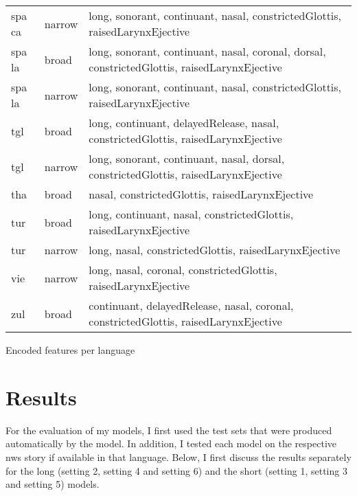 {\begin{tabularx}{1.1\textwidth}{|llX|}
spa ca             & narrow        & long, sonorant, continuant, nasal, constrictedGlottis, raisedLarynxEjective                                                        \\
spa la             & broad         & long, sonorant, continuant, nasal, coronal, dorsal, constrictedGlottis, raisedLarynxEjective                                       \\
spa la             & narrow        & long, sonorant, continuant, nasal, constrictedGlottis, raisedLarynxEjective                                                        \\
tgl                & broad         & long, continuant, delayedRelease, nasal, constrictedGlottis, raisedLarynxEjective                                                  \\
tgl                & narrow        & long, sonorant, continuant, nasal, dorsal, constrictedGlottis, raisedLarynxEjective                                                \\
tha                & broad         & nasal, constrictedGlottis, raisedLarynxEjective                                                                                    \\
tur                & broad         & long, continuant, nasal, constrictedGlottis, raisedLarynxEjective                                                                  \\
tur                & narrow        & long, nasal, constrictedGlottis, raisedLarynxEjective                                                                              \\
vie                & narrow        & long, nasal, coronal, constrictedGlottis, raisedLarynxEjective                                                                     \\
zul                & broad         & continuant, delayedRelease, nasal, coronal, constrictedGlottis, raisedLarynxEjective  \\
\hline                                            
\end{tabularx}
}{Encoded features per language}


\section{Results}

For the evaluation of my models, I first used the test sets that were produced automatically by the model. In addition, I tested each model on the respective \ac{nws} story if available in that language. Below, I first discuss the results separately for the long (setting 2, setting 4 and setting 6) and the short (setting 1, setting 3 and setting 5) models. 

